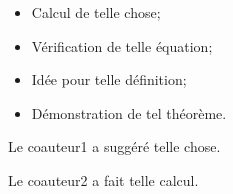 \setcounter{corA}{0} %
\francais


\contributions%
{
    \begin{itemize}
        \item Calcul de telle chose;
        \item Vérification de telle équation;
        \item Idée pour telle définition;
        \item Démonstration de tel théorème.
    \end{itemize}

    Le coauteur1 a suggéré telle chose.

    Le coauteur2 a fait telle calcul.\\[1cm]
}

